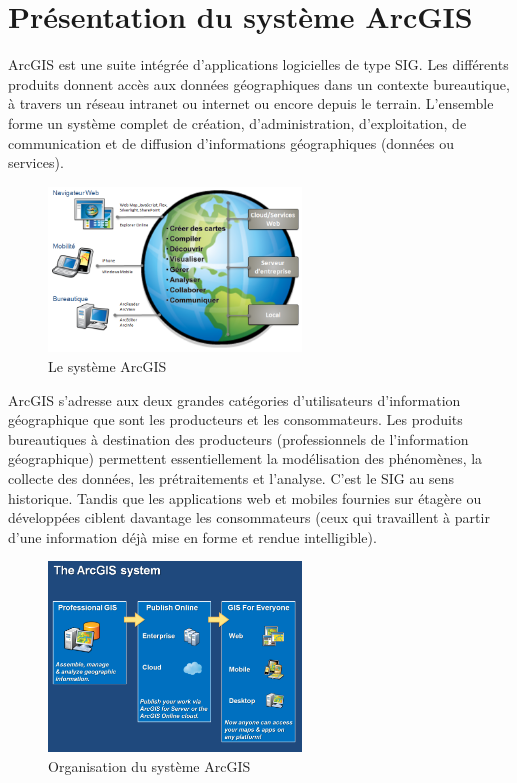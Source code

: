 \documentclass[11pt]{article}
\begin{document}
\newpage



\section{Présentation du système ArcGIS}
ArcGIS est une suite intégrée d’applications logicielles de type SIG. Les différents produits donnent accès aux données géographiques dans un contexte  bureautique, à travers un réseau intranet ou internet ou encore depuis le terrain. L’ensemble forme un système complet de création, d’administration, d’exploitation, de communication et de diffusion d’informations géographiques (données ou services).

\begin{figure}[H]
	\center \includegraphics[width=0.6\textwidth]{img/cours/le_systeme_arcgis_10.png}
	\caption{Le système ArcGIS}
\end{figure}

ArcGIS s’adresse aux deux grandes catégories d’utilisateurs d’information géographique que sont les producteurs et les consommateurs. Les produits bureautiques à destination des producteurs (professionnels de l’information géographique) permettent essentiellement la modélisation des phénomènes, la collecte des données, les prétraitements et l’analyse. C’est le SIG au sens historique. Tandis que les applications web et mobiles fournies sur étagère ou développées ciblent davantage les consommateurs (ceux qui travaillent à partir d’une information déjà mise en forme et rendue intelligible). 

\begin{figure}[H]
	\center \includegraphics[width=0.6\textwidth]{img/cours/le_systeme_arcgis_10-2.png}
	\caption{Organisation du système ArcGIS}
\end{figure}
\end{document}
